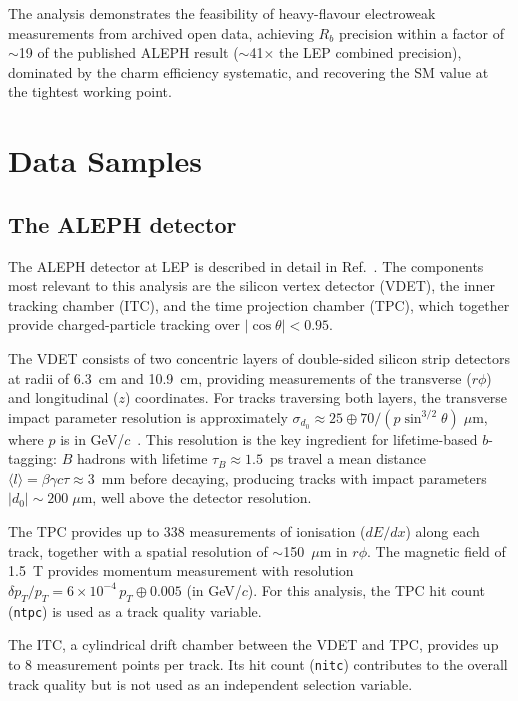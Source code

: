 \documentclass[11pt,a4paper]{article}
\begin{document}
The analysis demonstrates the feasibility of heavy-flavour
electroweak measurements from archived open data, achieving
$R_b$ precision within a factor of $\sim$19 of the published ALEPH
result ($\sim$41$\times$ the LEP combined precision),
dominated by the charm efficiency systematic, and
recovering the SM value at the tightest working point.

\section{Data Samples}
\label{sec:data}

\subsection{The ALEPH detector}
\label{sec:data:detector}

The ALEPH detector at LEP is described in detail
in Ref.~\cite{ALEPH:sigma_had}.
The components most relevant to this analysis are the silicon
vertex detector (VDET), the inner tracking chamber (ITC), and
the time projection chamber (TPC), which together provide
charged-particle tracking over $|\cos\theta| < 0.95$.

The VDET consists of two concentric layers of double-sided silicon
strip detectors at radii of 6.3~cm and 10.9~cm, providing
measurements of the transverse ($r\phi$) and longitudinal ($z$)
coordinates.
For tracks traversing both layers, the transverse impact parameter
resolution is approximately
$\sigma_{d_0} \approx 25 \oplus 70/(p\sin^{3/2}\theta)\;\mu$m,
where $p$ is in GeV/$c$~\cite{ALEPH:Rb:precise}.
This resolution is the key ingredient for lifetime-based $b$-tagging:
$B$ hadrons with lifetime $\tau_B \approx 1.5$~ps travel a mean
distance $\langle l \rangle = \beta\gamma c\tau \approx 3$~mm
before decaying, producing tracks with impact parameters
$|d_0| \sim 200\;\mu$m, well above the detector resolution.

The TPC provides up to 338 measurements of ionisation ($dE/dx$)
along each track, together with a spatial resolution of
$\sim$150~$\mu$m in $r\phi$.
The magnetic field of 1.5~T provides momentum measurement with
resolution $\delta p_T / p_T = 6 \times 10^{-4}\, p_T \oplus
0.005$ (in GeV/$c$).
For this analysis, the TPC hit count (\texttt{ntpc}) is used as
a track quality variable.

The ITC, a cylindrical drift chamber between the VDET and TPC,
provides up to 8 measurement points per track.
Its hit count (\texttt{nitc}) contributes to the overall track
quality but is not used as an independent selection variable.
\end{document}
